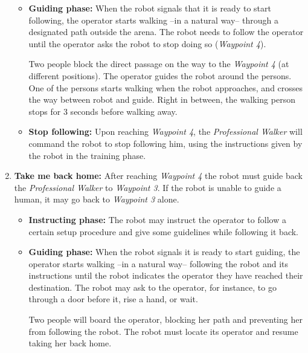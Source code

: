 \begin{enumerate}
\begin{itemize}
		\item \textbf{Guiding phase:} When the robot signals that it is ready to start following, the operator starts walking --in a natural way-- through a designated path outside the arena. The robot needs to follow the operator until the operator asks the robot to stop doing so (\textit{Waypoint 4}).

		Two people block the direct passage on the way to the \textit{Waypoint 4} (at different positions). The operator guides the robot around the persons. One of the persons starts walking when the robot approaches, and crosses the way between robot and guide. Right in between, the walking person stops for 3 seconds before walking away.

		\item \textbf{Stop following:} Upon reaching \textit{Waypoint 4}, the \textit{Professional Walker} will command the robot to stop following him, using the instructions given by the robot in the training phase.
	\end{itemize}
	
	\item \textbf{Take me back home:} After reaching \textit{Waypoint 4} the robot must guide back the \textit{Professional Walker} to \textit{Waypoint 3}. If the robot is unable to guide a human, it may go back to \textit{Waypoint 3} alone.
	\begin{itemize}
		\item \textbf{Instructing phase:} The robot may instruct the operator to follow a certain setup procedure and give some guidelines while following it back.
		
		\item \textbf{Guiding phase:} When the robot signals it is ready to start guiding, the operator starts walking --in a natural way-- following the robot and its instructions until the robot indicates the operator they have reached their destination. The robot may ask to the operator, for instance, to go through a door before it, rise a hand, or wait.

		Two people will board the operator, blocking her path and preventing her from following the robot. The robot must locate its operator and resume taking her back home.


\end{itemize}
\end{enumerate}
